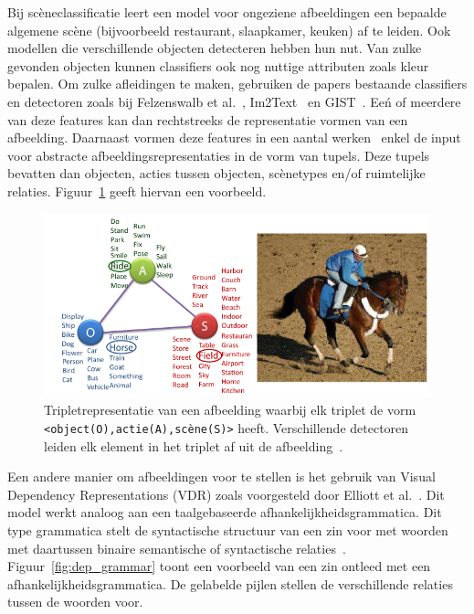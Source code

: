 Bij sc\`eneclassificatie leert een model voor ongeziene afbeeldingen een bepaalde algemene sc\`ene (bijvoorbeeld restaurant, slaapkamer, keuken) af te leiden. Ook modellen die verschillende objecten detecteren hebben hun nut. Van zulke gevonden objecten kunnen classifiers ook nog nuttige attributen zoals kleur bepalen. Om zulke afleidingen te maken, gebruiken de papers bestaande classifiers en detectoren zoals bij Felzenswalb et al.~\cite{Felzenszwalb2008}, Im2Text~\cite{Ordonez2011} en GIST~\cite{Oliva2006}. Ee\'n of meerdere van deze features kan dan rechtstreeks de representatie vormen van een afbeelding. Daarnaast vormen deze features in een aantal werken~\cite{Farhadi2010,Li2011,Mitchell2012,Yang2011} enkel de input voor abstracte afbeeldingsrepresentaties in de vorm van tupels. Deze tupels bevatten dan objecten, acties tussen objecten, sc\`enetypes en/of ruimtelijke relaties. Figuur~\ref{fig:imgtriplets} geeft hiervan een voorbeeld.

\begin{figure}[tb]
	\centering
	\includegraphics[width=\linewidth]{Images/imgtriples.PNG}
	\caption[Tripletrepresentatie van een afbeelding]{Tripletrepresentatie van een afbeelding waarbij elk triplet de vorm \texttt{<object(O),actie(A),sc\`ene(S)>} heeft. Verschillende detectoren leiden elk element in het triplet af uit de afbeelding~\cite{Farhadi2010}.}
	\label{fig:imgtriplets}
\end{figure}  

Een andere manier om afbeeldingen voor te stellen is het gebruik van Visual Dependency Representations (VDR) zoals voorgesteld door Elliott et al.~\cite{Elliott2013}. Dit model werkt analoog aan een taalgebaseerde afhankelijkheidsgrammatica. Dit type grammatica stelt de syntactische structuur van een zin voor met woorden met daartussen binaire semantische of syntactische relaties~\cite{Jurafsky:2009:SLP:1214993}. Figuur~\ref{fig:dep_grammar} toont een voorbeeld van een zin ontleed met een afhankelijkheidsgrammatica. De gelabelde pijlen stellen de verschillende relaties tussen de woorden voor.

